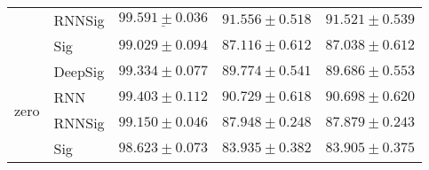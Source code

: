 \begin{tabular}{lllll}
                                 & RNNSig  &            $  \underline{ 99.591 \pm 0.036 } $ &                           $ 91.556 \pm 0.518 $ &                           $ 91.521 \pm 0.539 $ \\
                                 & Sig     &                           $ 99.029 \pm 0.094 $ &                           $ 87.116 \pm 0.612 $ &                           $ 87.038 \pm 0.612 $ \\
\midrule
\multirow{4}{*}{zero}            & DeepSig &                           $ 99.334 \pm 0.077 $ &                           $ 89.774 \pm 0.541 $ &                           $ 89.686 \pm 0.553 $ \\
                                 & RNN     &                           $ 99.403 \pm 0.112 $ &                           $ 90.729 \pm 0.618 $ &                           $ 90.698 \pm 0.620 $ \\
                                 & RNNSig  &                           $ 99.150 \pm 0.046 $ &                           $ 87.948 \pm 0.248 $ &                           $ 87.879 \pm 0.243 $ \\
                                 & Sig     &                           $ 98.623 \pm 0.073 $ &                           $ 83.935 \pm 0.382 $ &                           $ 83.905 \pm 0.375 $ \\
\bottomrule
\end{tabular}
